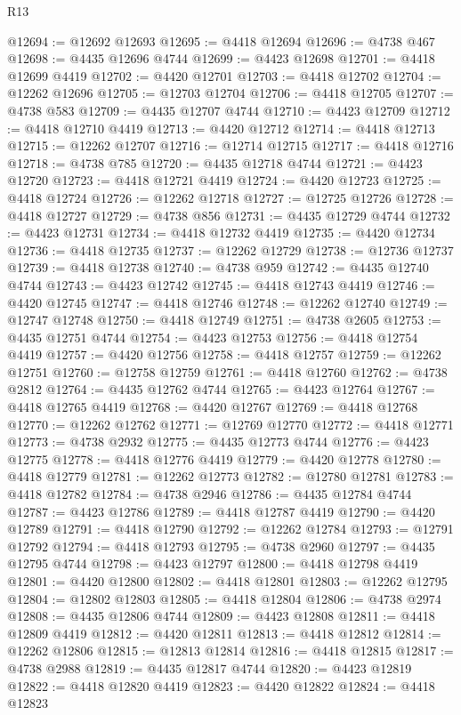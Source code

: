 \begin{lexlean}{R13}
\begin{coremodule}
@12694 := @12692 @12693
@12695 := @4418 @12694
@12696 := @4738 @467
@12698 := @4435 @12696 @4744
@12699 := @4423 @12698
@12701 := @4418 @12699 @4419
@12702 := @4420 @12701
@12703 := @4418 @12702
@12704 := @12262 @12696
@12705 := @12703 @12704
@12706 := @4418 @12705
@12707 := @4738 @583
@12709 := @4435 @12707 @4744
@12710 := @4423 @12709
@12712 := @4418 @12710 @4419
@12713 := @4420 @12712
@12714 := @4418 @12713
@12715 := @12262 @12707
@12716 := @12714 @12715
@12717 := @4418 @12716
@12718 := @4738 @785
@12720 := @4435 @12718 @4744
@12721 := @4423 @12720
@12723 := @4418 @12721 @4419
@12724 := @4420 @12723
@12725 := @4418 @12724
@12726 := @12262 @12718
@12727 := @12725 @12726
@12728 := @4418 @12727
@12729 := @4738 @856
@12731 := @4435 @12729 @4744
@12732 := @4423 @12731
@12734 := @4418 @12732 @4419
@12735 := @4420 @12734
@12736 := @4418 @12735
@12737 := @12262 @12729
@12738 := @12736 @12737
@12739 := @4418 @12738
@12740 := @4738 @959
@12742 := @4435 @12740 @4744
@12743 := @4423 @12742
@12745 := @4418 @12743 @4419
@12746 := @4420 @12745
@12747 := @4418 @12746
@12748 := @12262 @12740
@12749 := @12747 @12748
@12750 := @4418 @12749
@12751 := @4738 @2605
@12753 := @4435 @12751 @4744
@12754 := @4423 @12753
@12756 := @4418 @12754 @4419
@12757 := @4420 @12756
@12758 := @4418 @12757
@12759 := @12262 @12751
@12760 := @12758 @12759
@12761 := @4418 @12760
@12762 := @4738 @2812
@12764 := @4435 @12762 @4744
@12765 := @4423 @12764
@12767 := @4418 @12765 @4419
@12768 := @4420 @12767
@12769 := @4418 @12768
@12770 := @12262 @12762
@12771 := @12769 @12770
@12772 := @4418 @12771
@12773 := @4738 @2932
@12775 := @4435 @12773 @4744
@12776 := @4423 @12775
@12778 := @4418 @12776 @4419
@12779 := @4420 @12778
@12780 := @4418 @12779
@12781 := @12262 @12773
@12782 := @12780 @12781
@12783 := @4418 @12782
@12784 := @4738 @2946
@12786 := @4435 @12784 @4744
@12787 := @4423 @12786
@12789 := @4418 @12787 @4419
@12790 := @4420 @12789
@12791 := @4418 @12790
@12792 := @12262 @12784
@12793 := @12791 @12792
@12794 := @4418 @12793
@12795 := @4738 @2960
@12797 := @4435 @12795 @4744
@12798 := @4423 @12797
@12800 := @4418 @12798 @4419
@12801 := @4420 @12800
@12802 := @4418 @12801
@12803 := @12262 @12795
@12804 := @12802 @12803
@12805 := @4418 @12804
@12806 := @4738 @2974
@12808 := @4435 @12806 @4744
@12809 := @4423 @12808
@12811 := @4418 @12809 @4419
@12812 := @4420 @12811
@12813 := @4418 @12812
@12814 := @12262 @12806
@12815 := @12813 @12814
@12816 := @4418 @12815
@12817 := @4738 @2988
@12819 := @4435 @12817 @4744
@12820 := @4423 @12819
@12822 := @4418 @12820 @4419
@12823 := @4420 @12822
@12824 := @4418 @12823

\end{coremodule}
\end{lexlean}

